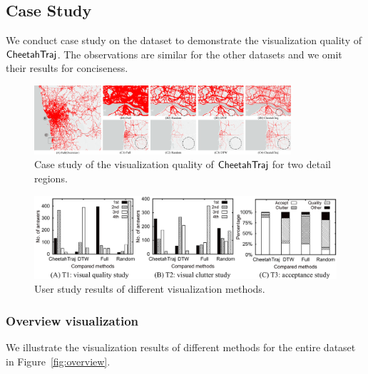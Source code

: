 \subsection{Case Study}\label{sec:case}

We conduct case study on the \pt{} dataset to demonstrate the visualization quality of $\mathsf{CheetahTraj}$. The observations are similar for the other datasets and we omit their results for conciseness.

\begin{figure}[t]
	\centering
	\includegraphics[width=0.85\textwidth]{pictures/case_study_icde/case_study_detail.pdf}
	\trim
	\vspace{-2mm}
	\caption{Case study of the visualization quality of $\mathsf{CheetahTraj}$ for two detail regions.}
	\label{fig:detailview}
	\trim \trim
\end{figure}

\begin{figure}
	\centering
	\small
	\includegraphics[width=1.3\columnwidth]{pictures/user_study/user_study.pdf}  
	\trim \trim
	\caption{User study results of different visualization methods.} 
	\label{fig:userstudy}
	\trim \trim
\end{figure}



\subsubsection{Overview visualization}

We illustrate the visualization results of different methods for the entire \pt{} dataset in Figure~\ref{fig:overview}.


